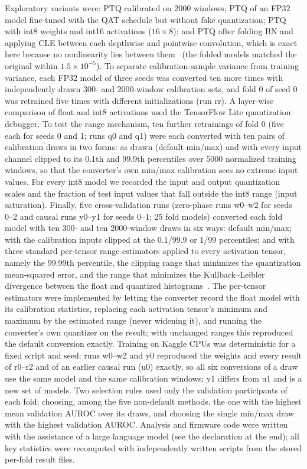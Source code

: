 \documentclass[preprint,12pt]{elsarticle}
\begin{document}
Exploratory variants were: PTQ calibrated on 2000 windows; PTQ of an FP32 model fine-tuned with the QAT schedule but without fake quantization; PTQ with int8 weights and int16 activations ($16\times8$); and PTQ after folding BN and applying CLE between each depthwise and pointwise convolution, which is exact here because no nonlinearity lies between them~\cite{NagelDFQ2019} (the folded models matched the original within $1.5\times10^{-5}$). To separate calibration-sample variance from training variance, each FP32 model of three seeds was converted ten more times with independently drawn 300- and 2000-window calibration sets, and fold 0 of seed 0 was retrained five times with different initializations (run rr). A layer-wise comparison of float and int8 activations used the TensorFlow Lite quantization debugger. To test the range mechanism, ten further retrainings of fold 0 (five each for seeds 0 and 1; runs q0 and q1) were each converted with ten pairs of calibration draws in two forms: as drawn (default min/max) and with every input channel clipped to its 0.1th and 99.9th percentiles over 5000 normalized training windows, so that the converter's own min/max calibration sees no extreme input values. For every int8 model we recorded the input and output quantization scales and the fraction of test input values that fall outside the int8 range (input saturation). Finally, five cross-validation runs (zero-phase runs w0--w2 for seeds 0--2 and causal runs y0--y1 for seeds 0--1; 25 fold models) converted each fold model with ten 300- and ten 2000-window draws in six ways: default min/max; with the calibration inputs clipped at the 0.1/99.9 or 1/99 percentiles; and with three standard per-tensor range estimators applied to every activation tensor, namely the 99.99th percentile, the clipping range that minimizes the quantization mean-squared error, and the range that minimizes the Kullback--Leibler divergence between the float and quantized histograms~\cite{Wu2020}. The per-tensor estimators were implemented by letting the converter record the float model with its calibration statistics, replacing each activation tensor's minimum and maximum by the estimated range (never widening it), and running the converter's own quantizer on the result; with unchanged ranges this reproduced the default conversion exactly. Training on Kaggle CPUs was deterministic for a fixed script and seed: runs w0--w2 and y0 reproduced the weights and every result of r0--r2 and of an earlier causal run (u0) exactly, so all six conversions of a draw use the same model and the same calibration windows; y1 differs from u1 and is a new set of models. Two selection rules used only the validation participants of each fold: choosing, among the five non-default methods, the one with the highest mean validation AUROC over its draws, and choosing the single min/max draw with the highest validation AUROC. Analysis and firmware code were written with the assistance of a large language model (see the declaration at the end); all key statistics were recomputed with independently written scripts from the stored per-fold result files.
\end{document}
